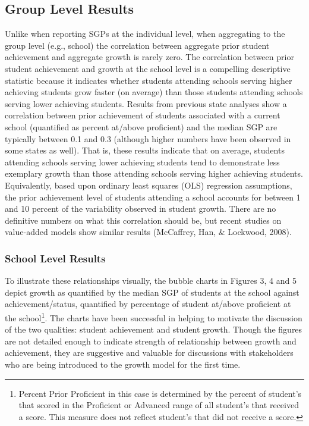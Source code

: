 \documentclass[12pt]{article}
\begin{document}
\subsection{Group Level Results}\label{group-level-results}

Unlike when reporting SGPs at the individual level, when aggregating to
the group level (e.g., school) the correlation between aggregate prior
student achievement and aggregate growth is rarely zero. The correlation
between prior student achievement and growth at the school level is a
compelling descriptive statistic because it indicates whether students
attending schools serving higher achieving students grow faster (on
average) than those students attending schools serving lower achieving
students. Results from previous state analyses show a correlation
between prior achievement of students associated with a current school
(quantified as percent at/above proficient) and the median SGP are
typically between 0.1 and 0.3 (although higher numbers have been
observed in some states as well). That is, these results indicate that
on average, students attending schools serving lower achieving students
tend to demonstrate less exemplary growth than those attending schools
serving higher achieving students. Equivalently, based upon ordinary
least squares (OLS) regression assumptions, the prior achievement level
of students attending a school accounts for between 1 and 10 percent of
the variability observed in student growth. There are no definitive
numbers on what this correlation should be, but recent studies on
value-added models show similar results (McCaffrey, Han, \& Lockwood,
2008).

\subsubsection{School Level Results}\label{school-level-results}

To illustrate these relationships visually, the bubble charts in Figures
3, 4 and 5 depict growth as quantified by the median SGP of students at
the school against achievement/status, quantified by percentage of
student at/above proficient at the school\footnote{Percent Prior
  Proficient in this case is determined by the percent of student's that
  scored in the Proficient or Advanced range of all student's that
  received a score. This measure does not reflect student's that did not
  receive a score.}. The charts have been successful in helping to
motivate the discussion of the two qualities: student achievement and
student growth. Though the figures are not detailed enough to indicate
strength of relationship between growth and achievement, they are
suggestive and valuable for discussions with stakeholders who are being
introduced to the growth model for the first time.
\end{document}
